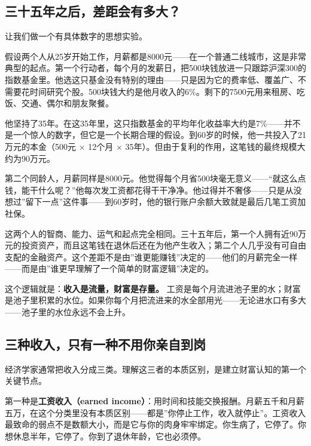 \documentclass[a4paper,11pt,oneside,fontset=none,UTF8,zihao=-4]{ctexbook}
\begin{document}
\subsection{三十五年之后，差距会有多大？}\label{ux4e09ux5341ux4e94ux5e74ux4e4bux540eux5deeux8dddux4f1aux6709ux591aux5927}

让我们做一个有具体数字的思想实验。

假设两个人从25岁开始工作，月薪都是8000元------在一个普通二线城市，这是非常典型的起点。第一个行动者，每个月的发薪日，把500块钱放进一只跟踪沪深300的指数基金里。他选这只基金没有特别的理由------只是因为它的费率低、覆盖广、不需要花时间研究个股。500块钱大约是他月收入的6\%。剩下的7500元用来租房、吃饭、交通、偶尔和朋友聚餐。

他坚持了35年。在这35年里，这只指数基金的平均年化收益率大约是7\%------并不是一个惊人的数字，但它是一个长期合理的假设。到60岁的时候，他一共投入了21万元的本金（500元
× 12个月 × 35年）。但由于复利的作用，这笔钱的最终规模大约为90万元。

第二个同龄人，月薪同样是8000元。他觉得每个月省500块毫无意义------``就这么点钱，能干什么呢？''他每次发工资都花得干干净净。他过得并不奢侈------只是从没想过''留下一点''这件事------到60岁时，他的银行账户余额大致就是最后几笔工资加社保。

这两个人的智商、能力、运气和起点完全相同。三十五年后，第一个人拥有近90万元的投资资产，而且这笔钱在退休后还在为他产生收入；第二个人几乎没有可自由支配的金融资产。这个差距不是由''谁更能赚钱''决定的------他们的月薪完全一样------而是由''谁更早理解了一个简单的财富逻辑''决定的。

这个逻辑就是：\textbf{收入是流量，财富是存量。}
工资是每个月流进池子里的水；财富是池子里积累的水位。如果你每个月把流进来的水全部用光------无论进水口有多大------池子里的水位永远不会上升。

\subsection{三种收入，只有一种不用你亲自到岗}\label{ux4e09ux79cdux6536ux5165ux53eaux6709ux4e00ux79cdux4e0dux7528ux4f60ux4eb2ux81eaux5230ux5c97}

经济学家通常把收入分成三类。理解这三者的本质区别，是建立财富认知的第一个关键节点。

第一种是\textbf{工资收入（earned
income）}：用时间和技能交换报酬。月薪五千和月薪五万，在这个分类里没有本质区别------都是''你停止工作，收入就停止''。工资收入最致命的弱点不是数额大小，而是它与你的肉身牢牢绑定。你生病了，它停了。你想休息半年，它停了。你到了退休年龄，它也必须停。
\end{document}
